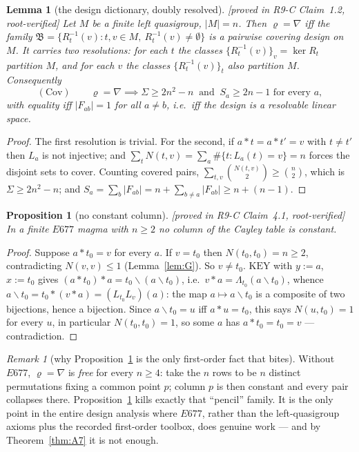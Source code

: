 \documentclass[11pt]{article}
\theoremstyle{plain}
\newtheorem{lemma}[theorem]{Lemma}
\newtheorem{proposition}[theorem]{Proposition}
\theoremstyle{definition}
\theoremstyle{remark}
\newtheorem*{remark*}{Remark}
\numberwithin{equation}{section}
\newcommand{\op}{\mathbin{*}}
\newcommand{\statusbox}[1]{{\small\sloppy\textsf{[#1]}}}
\newcommand{\PROVED}[1]{\statusbox{proved in #1, root-verified}}
\begin{document}
\begin{lemma}[the design dictionary, doubly resolved]\label{lem:designdict}
\PROVED{R9-C Claim~1.2}
Let $M$ be a finite left quasigroup, $|M| = n$. Then $\varrho = \nabla$ iff the
family $\mathfrak B = \{R_t^{-1}(v) : t,v\in M,\ R_t^{-1}(v)\ne\emptyset\}$ is a
pairwise covering design on $M$. It carries \emph{two} resolutions: for each $t$
the classes $\{R_t^{-1}(v)\}_v = \ker R_t$ partition $M$, and for each $v$ the
classes $\{R_t^{-1}(v)\}_t$ also partition $M$. Consequently
\[
  (\mathrm{Cov})\qquad \varrho = \nabla \implies
  \Sigma \ge 2n^2-n \ \text{ and }\ S_a\ge 2n-1 \text{ for every } a ,
\]
with equality iff $|F_{ab}| = 1$ for all $a\ne b$, i.e.\ iff the design is a
\emph{resolvable linear space}.
\end{lemma}

\begin{proof}
The first resolution is trivial. For the second, if $a\op t = a\op t' = v$ with
$t\ne t'$ then $L_a$ is not injective; and
$\sum_tN(t,v) = \sum_a\#\{t : L_a(t) = v\} = n$ forces the disjoint sets to
cover. Counting covered pairs,
$\sum_{t,v}\binom{N(t,v)}{2}\ge\binom n2$, which is $\Sigma\ge2n^2-n$; and
$S_a = \sum_b|F_{ab}| = n + \sum_{b\ne a}|F_{ab}|\ge n+(n-1)$.
\end{proof}

\begin{proposition}[no constant column]\label{prop:noconstcol}
\PROVED{R9-C Claim~4.1}
In a finite $E677$ magma with $n\ge2$ no column of the Cayley table is constant.
\end{proposition}

\begin{proof}
Suppose $a\op t_0 = v$ for every $a$. If $v = t_0$ then $N(t_0,t_0) = n\ge2$,
contradicting $N(v,v)\le1$ (Lemma~\ref{lem:G}). So $v\ne t_0$.
$\mathrm{KEY}$ with $y := a$, $x := t_0$ gives
$(a\op t_0)\op a = t_0\backslash(a\backslash t_0)$, i.e.\
$v\op a = \Lambda_{t_0}(a\backslash t_0)$, whence
$a\backslash t_0 = t_0\op(v\op a) = (L_{t_0}L_v)(a)$: the map $a\mapsto a\backslash t_0$
is a composite of two bijections, hence a bijection. Since $a\backslash t_0 = u$
iff $a\op u = t_0$, this says $N(u,t_0) = 1$ for every $u$, in particular
$N(t_0,t_0) = 1$, so some $a$ has $a\op t_0 = t_0 = v$ --- contradiction.
\end{proof}

\begin{remark*}[why Proposition~\ref{prop:noconstcol} is the only first-order
fact that bites]
Without $E677$, $\varrho = \nabla$ is \emph{free} for every $n\ge4$: take the $n$
rows to be $n$ distinct permutations fixing a common point $p$; column $p$ is then
constant and every pair collapses there. Proposition~\ref{prop:noconstcol} kills
exactly that ``pencil'' family. It is the only point in the entire design analysis
where $E677$, rather than the left-quasigroup axioms plus the recorded first-order
toolbox, does genuine work --- and by Theorem~\ref{thm:A7} it is not enough.
\end{remark*}
\end{document}
